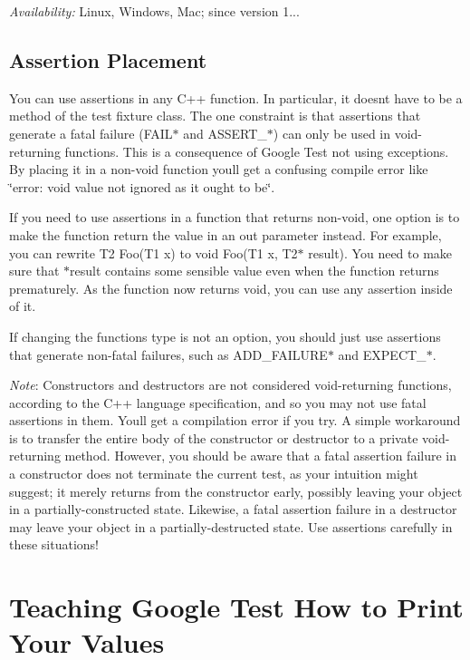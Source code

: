 {\itshape Availability\+:} Linux, Windows, Mac; since version 1...

\subsection*{Assertion Placement}

You can use assertions in any C++ function. In particular, it doesn\textquotesingle{}t have to be a method of the test fixture class. The one constraint is that assertions that generate a fatal failure ({\ttfamily F\+A\+I\+L$\ast$} and {\ttfamily A\+S\+S\+E\+R\+T\+\_\+$\ast$}) can only be used in void-\/returning functions. This is a consequence of Google Test not using exceptions. By placing it in a non-\/void function you\textquotesingle{}ll get a confusing compile error like {\ttfamily \char`\"{}error\+: void value not ignored as it ought to be\char`\"{}}.

If you need to use assertions in a function that returns non-\/void, one option is to make the function return the value in an out parameter instead. For example, you can rewrite {\ttfamily T2 Foo(\+T1 x)} to {\ttfamily void Foo(\+T1 x, T2$\ast$ result)}. You need to make sure that {\ttfamily $\ast$result} contains some sensible value even when the function returns prematurely. As the function now returns {\ttfamily void}, you can use any assertion inside of it.

If changing the function\textquotesingle{}s type is not an option, you should just use assertions that generate non-\/fatal failures, such as {\ttfamily A\+D\+D\+\_\+\+F\+A\+I\+L\+U\+R\+E$\ast$} and {\ttfamily E\+X\+P\+E\+C\+T\+\_\+$\ast$}.

{\itshape Note}\+: Constructors and destructors are not considered void-\/returning functions, according to the C++ language specification, and so you may not use fatal assertions in them. You\textquotesingle{}ll get a compilation error if you try. A simple workaround is to transfer the entire body of the constructor or destructor to a private void-\/returning method. However, you should be aware that a fatal assertion failure in a constructor does not terminate the current test, as your intuition might suggest; it merely returns from the constructor early, possibly leaving your object in a partially-\/constructed state. Likewise, a fatal assertion failure in a destructor may leave your object in a partially-\/destructed state. Use assertions carefully in these situations!

\section*{Teaching Google Test How to Print Your Values}

